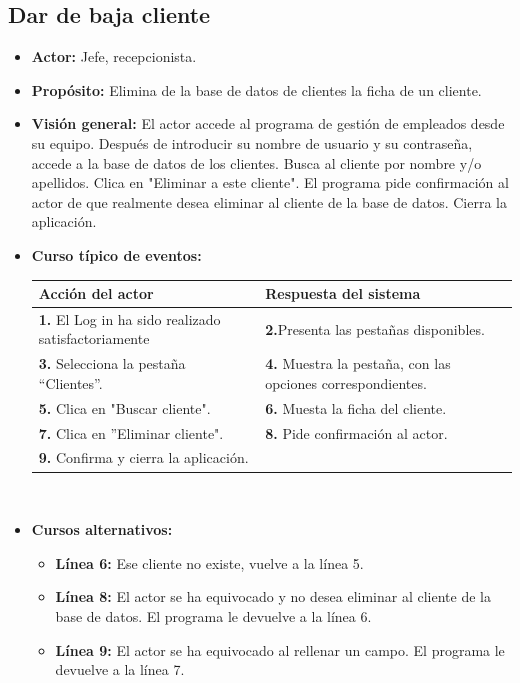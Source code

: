 \documentclass[spanish,a4paper,12pt]{report}	%
\begin{document}
	\subsection{Dar de baja cliente} 
			\begin{itemize}
			\item \textbf{Actor:} Jefe, recepcionista.
			\item \textbf{Propósito: } Elimina de la base de datos de clientes la ficha de un cliente.
			\item \textbf{Visión general:} El actor accede al programa de gestión de empleados desde su equipo. Después de introducir su nombre de usuario y su contraseña, accede a la base de datos de los clientes.  Busca al cliente por nombre y/o apellidos. Clica en "Eliminar a este cliente". El programa pide confirmación al actor de que realmente desea eliminar al cliente de la base de datos. Cierra la aplicación. 
			\item \textbf{Curso típico de eventos:} 	\\
				\begin{tabular}{|p{6cm}||p{6cm}|}
				\hline
				\textbf{Acción del actor} & \textbf{Respuesta del sistema} \\ \hline \hline
				\textbf{1.} El Log in ha sido realizado satisfactoriamente & \textbf{2.}Presenta las pestañas disponibles.\\ \hline 
				\textbf{3.} Selecciona la pestaña “Clientes”. & \textbf{4.} Muestra la pestaña, con las opciones correspondientes. \\ \hline
				\textbf{5.} Clica en "Buscar cliente".	& \textbf{6.} Muesta la ficha del cliente. \\ \hline
				\textbf{7.} Clica en ''Eliminar cliente". & \textbf{8.} Pide confirmación al actor.\\ \hline
				\textbf{9.} Confirma y cierra la aplicación. & \textbf{} \\ \hline
			\end{tabular}
			\\
			\item \textbf{Cursos alternativos:} 
			\begin{itemize}
			\item  \textbf{Línea 6:} Ese cliente no existe, vuelve a la línea 5.
			\item  \textbf{Línea 8:} El actor se ha equivocado y no desea eliminar al cliente de la base de datos. El programa le devuelve a la línea 6.
			\item  \textbf{Línea 9:} El actor se ha equivocado al rellenar un campo. El programa le devuelve a la línea 7.
			\end {itemize}
		\end{itemize}
\end{document}
